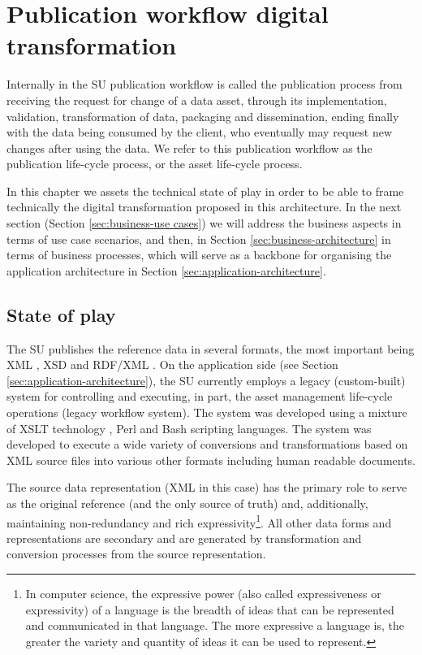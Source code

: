 \chapter{Publication workflow digital transformation}
\label{sec:context}
    
    Internally in the SU publication workflow is called the publication process from receiving the request for change of a data asset, through its implementation, validation, transformation of data, packaging and dissemination, ending finally with the data being consumed by the client, who eventually may request new changes after using the data. We refer to this publication workflow as the publication life-cycle process, or the asset life-cycle process.
    
    In this chapter we assets the technical state of play in order to be able to frame technically the digital transformation proposed in this architecture. In the next section (Section \ref{sec:business-use cases}) we will address the business aspects in terms of use case scenarios, and then, in Section \ref{sec:business-architecture} in terms of business processes, which will serve as a backbone for organising the application architecture in Section \ref{sec:application-architecture}.

	\section{State of play}
	The SU publishes the reference data in several formats, the most important being XML \citep{xml1-spec}, XSD \citep{xsd1.1-spec} and RDF/XML \citep{rdf-xml-Beckett:04:RSS,rdf-xml-Schreiber:14:RXS}. On the application side (see Section \ref{sec:application-architecture}), the SU currently employs a legacy (custom-built) system for controlling and executing, in part, the asset management life-cycle operations (legacy workflow system). The system was developed using a mixture of XSLT technology \cite{xslt3-Kay}, Perl and Bash scripting languages. The system was developed to execute a wide variety of conversions and transformations based on XML source files into various other formats including human readable documents.
	 
	The source data representation (XML in this case) has the primary role to serve as the original reference (and the only source of truth) and, additionally, maintaining non-redundancy and rich expressivity\footnote{In computer science, the expressive power (also called expressiveness or expressivity) of a language is the breadth of ideas that can be represented and communicated in that language. The more expressive a language is, the greater the variety and quantity of ideas it can be used to represent.}. All other data forms and representations are secondary and are generated by transformation and conversion processes from the source representation.
	 
